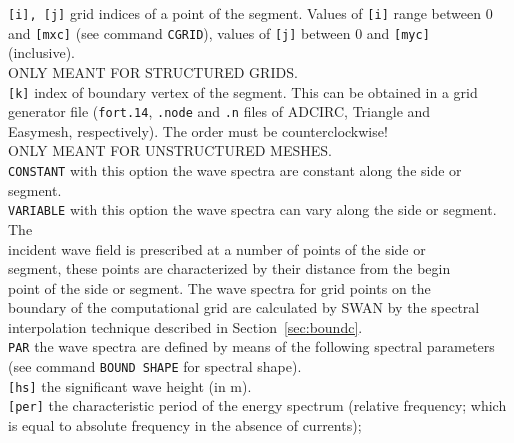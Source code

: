 \documentclass[12pt]{book}
\begin{document}
\begin{tabbing}
{\tt [i], [j]}       \> grid indices of a point of the segment. Values of {\tt [i]} range between 0\+\\
                        and {\tt [mxc]} (see command {\tt CGRID}), values of {\tt [j]} between 0 and {\tt [myc]}\\
                        (inclusive).\\
                        ONLY MEANT FOR STRUCTURED GRIDS.\-\\
{\tt [k]}            \> index of boundary vertex of the segment. This can be obtained in a grid\+\\
                        generator file ({\tt fort.14}, {\tt .node} and {\tt.n} files of ADCIRC, Triangle and\\
                        Easymesh, respectively). The order must be counterclockwise!\\
                        ONLY MEANT FOR UNSTRUCTURED MESHES.\-\\
{\tt CONSTANT}       \> with this option the wave spectra are constant along the side or segment.\\
{\tt VARIABLE}       \> with this option the wave spectra can vary along the side or segment. The\+\\
                        incident wave field is prescribed at a number of points of the side or\\
                        segment, these points are characterized by their distance from the begin\\
                        point of the side or segment. The wave spectra for grid points on the\\
                        boundary of the computational grid are calculated by SWAN by the spectral\\
                        interpolation technique described in Section~\ref{sec:boundc}.\-\\
{\tt PAR}            \> the wave spectra are defined by means of the following spectral parameters\+\\
                        (see command {\tt BOUND SHAPE} for spectral shape).\-\\
{\tt [hs]}           \> the significant wave height (in m).\\
{\tt [per]}          \> the characteristic period of the energy spectrum (relative frequency; which\+\\
                        is equal to absolute frequency in the absence of currents);\\

\end{tabbing}
\end{document}
